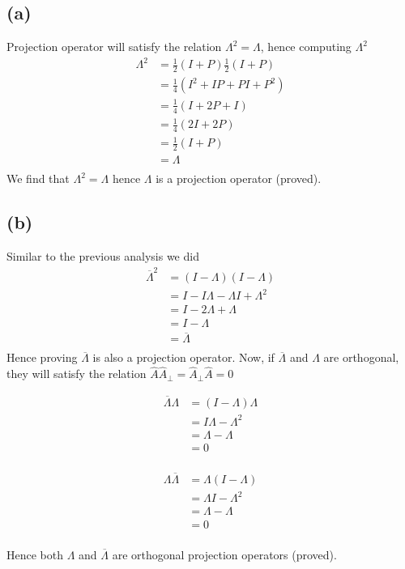 \documentclass[letter, 10pts]{article}
\begin{document}
\subsection*{(a)} 
Projection operator will satisfy the relation $\Lambda^2 = \Lambda$, hence computing $\Lambda^2$
\begin{align*}
\Lambda^2 &= 
\frac{1}{2} (I + P)
\frac{1}{2} (I + P)
\\
&= 
\frac{1}{4} (I^2 + IP + P I + P ^2)
\\
&= 
\frac{1}{4}
(I + 2 P + I)
\\
&= 
\frac{1}{4}
(2I + 2 P )
\\
&= \frac{1}{2} ( I + P ) \\ 
&= \Lambda \\
\end{align*}
We find that $\Lambda^2 = \Lambda$ hence $\Lambda$ is a projection operator (proved). 




\subsection*{(b)} 
Similar to the previous analysis we did 
\begin{align*}
\overline{\Lambda} ^2 &= 
(I - \Lambda )(I - \Lambda )\\
&= I - I \Lambda  - \Lambda I + \Lambda^2 \\
&= I - 2 \Lambda + \Lambda \\ 
&= I - \Lambda \\ 
&= \overline{ \Lambda} \\
\end{align*}
Hence proving $\overline{\Lambda}$ is also a projection operator. Now, if $\overline{\Lambda}$ and $\Lambda$ are orthogonal, they will satisfy the relation $\hat{A} \hat{A}_\perp = \hat{A}_\perp \hat{A} = 0$ 

\begin{minipage}{0.5\textwidth}
\begin{align*}
\overline{\Lambda} \Lambda &= 
(I - \Lambda) \Lambda 
\\
&= I \Lambda - \Lambda^2  \\
&= \Lambda - \Lambda \\ 
&= 0 \\
\end{align*}
\end{minipage}
\hfill
\begin{minipage}{0.5\textwidth}
\begin{align*} \Lambda
	\overline{\Lambda} &= \Lambda ( I - \Lambda) \\
	&= \Lambda I - \Lambda ^2 \\
	&= \Lambda - \Lambda \\ 
	&= 0 \\
\end{align*}
\end{minipage}
Hence both $\Lambda$ and $\overline{\Lambda}$ are orthogonal projection operators (proved).
\end{document}
